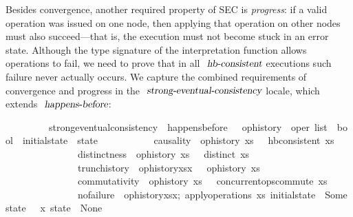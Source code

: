 Besides convergence, another required property of SEC is \emph{progress}: if a valid operation was issued on one node, then applying that operation on other nodes must also succeed---that is, the execution must not become stuck in an error state.
Although the type signature of the interpretation function allows operations to fail, we need to prove that in all $\isa{hb-consistent}$ executions such failure never actually occurs.
We capture the combined requirements of convergence and progress in the $\isa{strong-eventual-consistency}$ locale, which extends $\isa{happens-before}$:
\vspace{0.35em}
\begin{isabellebody}
\ \ \ \ \ \ \ \ \ strong{\isacharunderscore}eventual{\isacharunderscore}consistency\ {\isacharequal}\ happens{\isacharunderscore}before\ {\isacharplus}\ \ op{\isacharunderscore}history\ {\isacharcolon}{\isacharcolon}\ {\isachardoublequoteopen}{\isacharprime}oper\ list\ {\isasymRightarrow}\ bool{\isachardoublequoteclose}\ \ initial{\isacharunderscore}state\ {\isacharcolon}{\isacharcolon}\ {\isachardoublequoteopen}{\isacharprime}state{\isachardoublequoteclose}\isanewline
\ \ \ \ \ \ \ \ \ \ \ causality{\isacharcolon}\ {\isasymlbrakk}\ {\isachardoublequoteopen}op{\isacharunderscore}history\ xs\ {\isasymrbrakk}\ {\isasymLongrightarrow}\ hb{\isacharunderscore}consistent\ xs{\isachardoublequoteclose}\isanewline
\ \ \ \ \ \ \ \ \ \ \ \ \ \ \ distinctness{\isacharcolon}\ {\isasymlbrakk}\ {\isachardoublequoteopen}op{\isacharunderscore}history\ xs\ {\isasymrbrakk}\ {\isasymLongrightarrow}\ distinct\ xs{\isachardoublequoteclose}\isanewline
\ \ \ \ \ \ \ \ \ \ \ \ \ \ \ trunc{\isacharunderscore}history{\isacharcolon}\ {\isasymlbrakk}\ {\isachardoublequoteopen}op{\isacharunderscore}history{\isacharparenleft}xs{\isacharat}{\isacharbrackleft}x{\isacharbrackright}{\isacharparenright}\ {\isasymrbrakk}\ {\isasymLongrightarrow}\ op{\isacharunderscore}history\ xs{\isachardoublequoteclose}\isanewline
\ \ \ \ \ \ \ \ \ \ \ \ \ \ \ commutativity{\isacharcolon}\ {\isasymlbrakk}\ {\isachardoublequoteopen}op{\isacharunderscore}history\ xs\ {\isasymrbrakk}\ {\isasymLongrightarrow}\ concurrent{\isacharunderscore}ops{\isacharunderscore}commute\ xs{\isachardoublequoteclose}\isanewline
  \ \ \ \ \ \ \ \ \ \ \ \ \ \ \ no{\isacharunderscore}failure{\isacharcolon}\ {\isasymlbrakk}\ {\isachardoublequoteopen}op{\isacharunderscore}history{\isacharparenleft}xs{\isacharat}{\isacharbrackleft}x{\isacharbrackright}{\isacharparenright};\ apply{\isacharunderscore}operations\ xs\ initial{\isacharunderscore}state\ {\isacharequal}\ Some\ state\ {\isasymrbrakk}\ {\isasymLongrightarrow}\ {\isasymlangle}x{\isasymrangle}\ state\ {\isasymnoteq}\ None{\isachardoublequoteclose}
\end{isabellebody}
